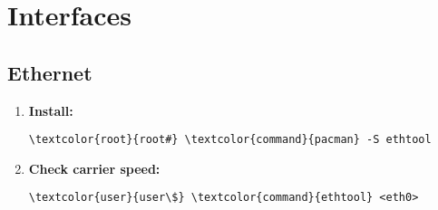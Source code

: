 \documentclass[10pt, a4paper, onecolumn, openany]{book} %
\begin{document}
\section{Interfaces}
\subsection{Ethernet}
\begin{enumerate}
    \item \textbf{Install:}
\begin{Verbatim}[commandchars=\\\{\}]
\textcolor{root}{root#} \textcolor{command}{pacman} -S ethtool
\end{Verbatim} 
    \item \textbf{Check carrier speed:}
\begin{Verbatim}[commandchars=\\\{\}]
\textcolor{user}{user\$} \textcolor{command}{ethtool} <eth0>
\end{Verbatim}
\end{enumerate}
\end{document}
